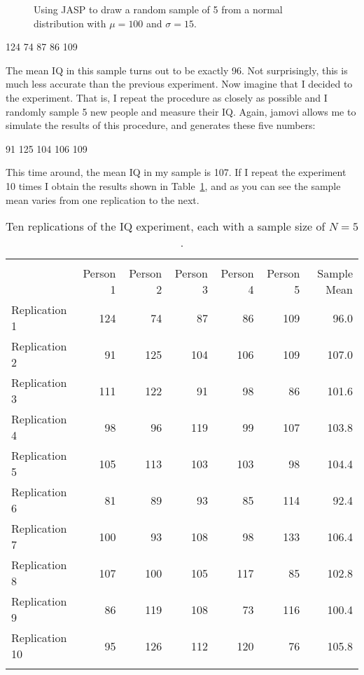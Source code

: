 \begin{figure}[p]
\begin{center}
\end{center}
\caption{Using JASP to draw a random sample of 5 from a normal distribution with $\mu=100$ and $\sigma=15$.}
\label{fig:IQsample}
\HR
\end{figure}

\begin{rblock1}
124 74 87 86 109
\end{rblock1}

The mean IQ in this sample turns out to be exactly 96. Not surprisingly, this is much less accurate than the previous experiment. Now imagine that I decided to  the experiment. That is, I repeat the procedure as closely as possible and I randomly sample 5 new people and measure their IQ. Again, jamovi allows me to simulate the results of this procedure, and generates these five numbers:

\begin{rblock1}
91 125 104 106 109
\end{rblock1}

This time around, the mean IQ in my sample is 107. If I repeat the experiment 10 times I obtain the results shown in Table~\ref{tab:replications}, and as you can see the sample mean varies from one replication to the next. 

\begin{table}[t]
\centering
\caption{Ten replications of the IQ experiment, each with a sample size of $N=5$.}
\label{tab:replications}
\begin{tabular}{l|rrrrr|r}
 \multicolumn{6}{c}{} \\
 & Person 1 & Person 2 & Person 3 & Person 4 & Person 5 & Sample Mean \\ 
  \hline
Replication 1 & 124 & 74 & 87 & 86 & 109 & 96.0 \\ 
  Replication 2 & 91 & 125 & 104 & 106 & 109 & 107.0 \\ 
  Replication 3 & 111 & 122 & 91 & 98 & 86 & 101.6 \\ 
  Replication 4 & 98 & 96 & 119 & 99 & 107 & 103.8 \\ 
  Replication 5 & 105 & 113 & 103 & 103 & 98 & 104.4 \\ 
  Replication 6 & 81 & 89 & 93 & 85 & 114 & 92.4 \\ 
  Replication 7 & 100 & 93 & 108 & 98 & 133 & 106.4 \\ 
  Replication 8 & 107 & 100 & 105 & 117 & 85 & 102.8 \\ 
  Replication 9 & 86 & 119 & 108 & 73 & 116 & 100.4 \\ 
  Replication 10 & 95 & 126 & 112 & 120 & 76 & 105.8 \\ 
  \multicolumn{6}{c}{} \\
\end{tabular}
\HR
\end{table}

